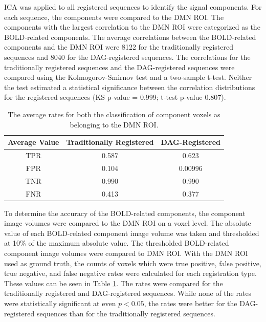 ICA was applied to all registered sequences to identify the signal components. For each sequence, the components were compared to the DMN ROI. The components with the largest correlation to the DMN ROI were categorized as the BOLD-related components. The average correlations between the BOLD-related components and the DMN ROI were 8122 for the traditionally registered sequences and 8040 for the DAG-registered sequences. The correlations for the traditionally registered sequences and the DAG-registered sequences were compared using the Kolmogorov-Smirnov test and a two-sample t-test. Neither the test estimated a statistical significance between the correlation distributions for the registered sequences (KS p-value = 0.999; t-test p-value 0.807).

\begin{table}[]
\centering
\caption{The average rates for both the classification of component voxels as belonging to the DMN ROI.}
\label{tab:spectr-avg-rates}
\begin{tabular}{|c|c|c|}
\hline
\textbf{Average Value} & \textbf{Traditionally Registered} & \textbf{DAG-Registered} \\ \hline
TPR                    & 0.587                             & 0.623                   \\ \hline
FPR                    & 0.104                             & 0.00996                 \\ \hline
TNR                    & 0.990                             & 0.990                   \\ \hline
FNR                    & 0.413                             & 0.377                   \\ \hline
\end{tabular}
\end{table}

To determine the accuracy of the BOLD-related components, the component image volumes were compared to the DMN ROI on a voxel level. The absolute value of each BOLD-related component image volume was taken and thresholded at 10\% of the maximum absolute value. The thresholded BOLD-related component image volumes were compared to DMN ROI. With the DMN ROI used as ground truth, the counts of voxels which were true positive, false positive, true negative, and false negative rates were calculated for each registration type. These values can be seen in Table \ref{tab:spectr-avg-rates}. The rates were compared for the traditionally registered and DAG-registered sequences. While none of the rates were statistically significant at even $ p < 0.05$, the rates were better for the DAG-registered sequences than for the traditionally registered sequences. 

